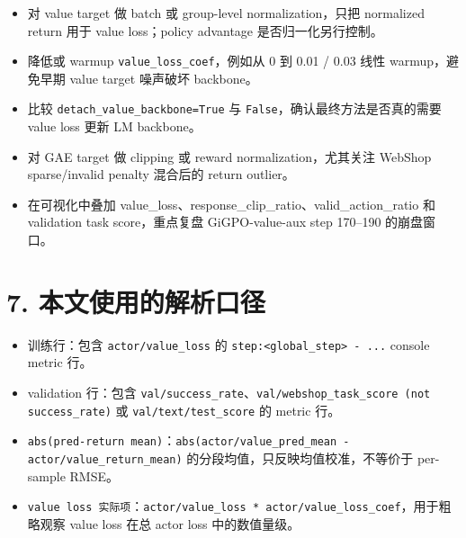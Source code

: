 \documentclass[10pt]{ctexart}
\begin{document}
\begin{itemize}
\item 对 value target 做 batch 或 group-level normalization，只把 normalized return 用于 value loss；policy advantage 是否归一化另行控制。
\item 降低或 warmup \texttt{value\_loss\_coef}，例如从 0 到 0.01 / 0.03 线性 warmup，避免早期 value target 噪声破坏 backbone。
\item 比较 \texttt{detach\_value\_backbone=True} 与 \texttt{False}，确认最终方法是否真的需要 value loss 更新 LM backbone。
\item 对 GAE target 做 clipping 或 reward normalization，尤其关注 WebShop sparse/invalid penalty 混合后的 return outlier。
\item 在可视化中叠加 value\_loss、response\_clip\_ratio、valid\_action\_ratio 和 validation task score，重点复盘 GiGPO-value-aux step 170--190 的崩盘窗口。
\end{itemize}

\section*{7. 本文使用的解析口径}

\begin{itemize}
\item 训练行：包含 \texttt{actor/value\_loss} 的 \texttt{step:<global\_step> - ...} console metric 行。
\item validation 行：包含 \texttt{val/success\_rate}、\texttt{val/webshop\_task\_score (not success\_rate)} 或 \texttt{val/text/test\_score} 的 metric 行。
\item \texttt{abs(pred-return mean)}：\texttt{abs(actor/value\_pred\_mean - actor/value\_return\_mean)} 的分段均值，只反映均值校准，不等价于 per-sample RMSE。
\item \texttt{value loss 实际项}：\texttt{actor/value\_loss * actor/value\_loss\_coef}，用于粗略观察 value loss 在总 actor loss 中的数值量级。
\end{itemize}
\end{document}
